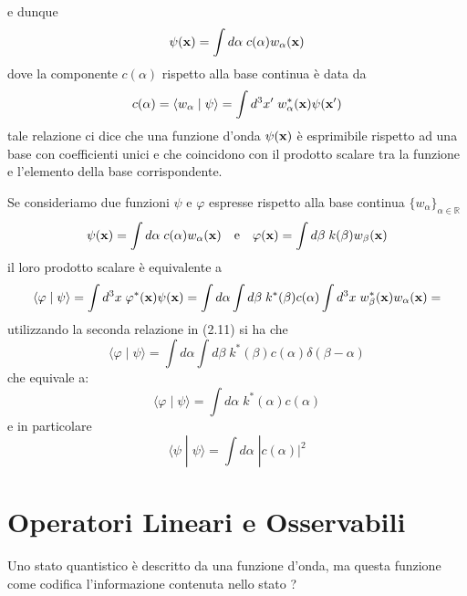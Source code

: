 e dunque 
\begin{equation}
	\psi(\bold{x}) = \int d\alpha\;  c(\alpha)w_\alpha(\bold{x})
\end{equation}
dove la componente $c(\alpha)$ rispetto alla base continua \`e data da 
\begin{equation}
	c(\alpha) = \langle w_\alpha \; | \; \psi \rangle =\int d^3x' \; w_\alpha^*(\bold{x})\psi(\bold{x}') 
\end{equation}
tale relazione ci dice che una funzione d'onda $\psi(\bold{x})$ \`e esprimibile rispetto ad una base con coefficienti unici e che coincidono con il prodotto scalare tra la funzione e l'elemento della base corrispondente.
\newline

\noindent Se consideriamo due funzioni $\psi$ e $\varphi$ espresse rispetto alla base continua $\{w_\alpha\}_{\alpha \in \mathbb{R}}$
\begin{equation*}
	\psi(\bold{x}) = \int d\alpha \; c(\alpha) w_{\alpha}(\bold{x}) \quad \text{e} \quad \varphi(\bold{x}) = \int d\beta \; k(\beta) w_{\beta}(\bold{x})
\end{equation*}  
il loro prodotto scalare \`e equivalente a 
\begin{equation*}
	\langle \varphi \; | \; \psi \rangle = \int d^3x \; \varphi^*(\bold{x}) \psi (\bold{x}) = \int d\alpha \int d\beta \;k^*(\beta)c(\alpha) \int d^3x \; w_{\beta}^*(\bold{x})w_{\alpha}(\bold{x})  =
\end{equation*}
utilizzando la seconda relazione in (2.11) si ha che
\begin{equation*}
	\langle \varphi \; | \; \psi \rangle = \int d \alpha \int d\beta \; k^*(\beta)c(\alpha) \delta(\beta - \alpha)
\end{equation*}
che equivale a:
\begin{equation}
	\langle \varphi \; | \; \psi \rangle  = \int d \alpha \; k^*(\alpha)c(\alpha)
\end{equation}
e in particolare 
\begin{equation}
	\langle \psi \; | \; \psi \rangle = \int d \alpha \; |c(\alpha)|^2
\end{equation}

\section{Operatori Lineari e Osservabili}

Uno stato quantistico \`e descritto da una funzione d'onda, ma questa funzione come codifica l'informazione contenuta nello stato ? 
\newline

